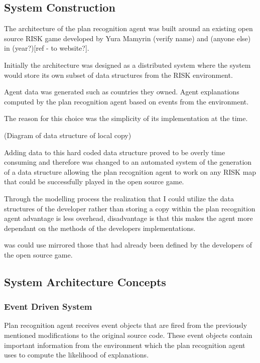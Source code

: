 \documentclass[parskip]{cs4rep}
\begin{document}
\subsection{System Construction}

The architecture of the plan recognition agent was built around an existing open source RISK game developed by Yura Mamyrin (verify name) and (anyone else) in (year?)[ref - to website?].

Initially the architecture was designed as a distributed system where the system would store its own subset of data structures from the RISK environment.

Agent data was generated such as countries they owned.
Agent explanations computed by the plan recognition agent based on events from the environment.

The reason for this choice was the simplicity of its implementation at the time.

(Diagram of data structure of local copy)

Adding data to this hard coded data structure proved to be overly time consuming and therefore was changed to an automated system of the generation of a data structure allowing the plan recognition agent to work on any RISK map that could be successfully played in the open source game.

Through the modelling process the realization that I could utilize the data structures of the developer rather than storing a copy within the plan recognition agent advantage is less overhead, disadvantage is that this makes the agent more dependant on the methods of the developers implementations.

 was could use mirrored those that had already been defined by the developers of the open source game.

\subsection{System Architecture Concepts}

\subsubsection{Event Driven System}

Plan recognition agent receives event objects that are fired from the previously mentioned modifications to the original source code. These event objects contain important information from the environment which the plan recognition agent uses to compute the likelihood of explanations.
\end{document}
